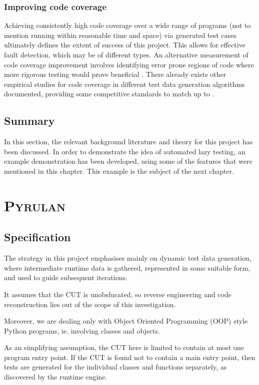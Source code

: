 \documentclass{icldt}
\numberwithin{equation}{section}       %
\begin{document}
\subsection{Improving code coverage}
Achieving consistently high code coverage over a wide range of programs (not to mention running within reasonable time and space) via generated test cases ultimately defines the extent of success of this project. This allows for effective fault detection, which may be of different types. An alternative measurement of code coverage improvement involves identifying error prone regions of code where more rigorous testing would prove beneficial \cite{Ntafos1988} \cite{InceDC1987}. There already exists other empirical studies for code coverage in different test data generation algorithms documented, providing some competitive standards to match up to \cite{Han2008} \cite{Rothermel99testcase} \cite{Lakhotia2009}.
\section{Summary}
In this section, the relevant background literature and theory for this project has been discussed. In order to demonstrate the idea of automated lazy testing, an example demonstration has been developed, using some of the features that were mentioned in this chapter. This example is the subject of the next chapter.
\chapter{\textsc{Pyrulan}}
\section{Specification}
The strategy in this project emphasises mainly on dynamic test data generation, where intermediate runtime data is gathered, represented in some suitable form, and used to guide subsequent iterations.

It assumes that the CUT is unobsfucated, so reverse engineering and code reconstruction lies out of the scope of this investigation.

Moreover, we are dealing only with Object Oriented Programming (OOP) style Python programs, ie. involving classes and objects.

As an simplifying assumption, the CUT here is limited to contain at most one program entry point. If the CUT is found not to contain a main entry point, then tests are generated for the individual classes and functions separately, as discovered by the runtime engine.
\end{document}
